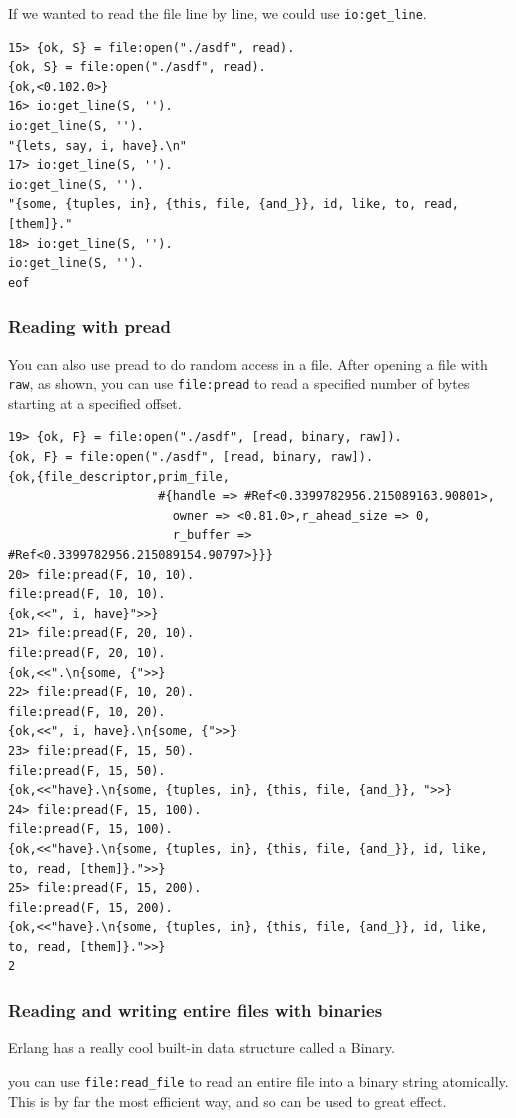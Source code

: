 \documentclass[11pt]{article}
\begin{document}
If we wanted to read the file line by line, we could use \texttt{io:get\_line}.
\begin{verbatim}
15> {ok, S} = file:open("./asdf", read).
{ok, S} = file:open("./asdf", read).
{ok,<0.102.0>}
16> io:get_line(S, '').
io:get_line(S, '').
"{lets, say, i, have}.\n"
17> io:get_line(S, '').
io:get_line(S, '').
"{some, {tuples, in}, {this, file, {and_}}, id, like, to, read, [them]}."
18> io:get_line(S, '').
io:get_line(S, '').
eof
\end{verbatim}

\subsubsection{Reading with pread}
\label{sec:orgc912064}
You can also use pread to do random access in a file. After
opening a file with \texttt{raw}, as shown, you can use \texttt{file:pread} to
read a specified number of bytes starting at a specified offset.
\begin{verbatim}
19> {ok, F} = file:open("./asdf", [read, binary, raw]).
{ok, F} = file:open("./asdf", [read, binary, raw]).
{ok,{file_descriptor,prim_file,
                     #{handle => #Ref<0.3399782956.215089163.90801>,
                       owner => <0.81.0>,r_ahead_size => 0,
                       r_buffer => #Ref<0.3399782956.215089154.90797>}}}
20> file:pread(F, 10, 10).
file:pread(F, 10, 10).
{ok,<<", i, have}">>}
21> file:pread(F, 20, 10).
file:pread(F, 20, 10).
{ok,<<".\n{some, {">>}
22> file:pread(F, 10, 20).
file:pread(F, 10, 20).
{ok,<<", i, have}.\n{some, {">>}
23> file:pread(F, 15, 50).
file:pread(F, 15, 50).
{ok,<<"have}.\n{some, {tuples, in}, {this, file, {and_}}, ">>}
24> file:pread(F, 15, 100).
file:pread(F, 15, 100).
{ok,<<"have}.\n{some, {tuples, in}, {this, file, {and_}}, id, like, to, read, [them]}.">>}
25> file:pread(F, 15, 200).
file:pread(F, 15, 200).
{ok,<<"have}.\n{some, {tuples, in}, {this, file, {and_}}, id, like, to, read, [them]}.">>}
2
\end{verbatim}

\subsubsection{Reading and writing entire files with binaries}
\label{sec:org2f5614d}
Erlang has a really cool built-in data structure called a Binary.

you can use \texttt{file:read\_file} to read an entire file into a binary
string atomically. This is by far the most efficient way, and so
can be used to great effect.
\end{document}
